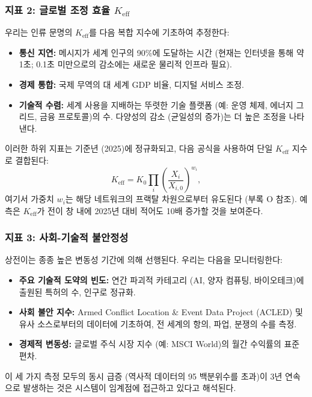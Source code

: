 \documentclass[12pt,a4paper]{article}
\theoremstyle{remark}
\begin{document}
	\subsubsection{지표 2: 글로벌 조정 효율 \(K_{\text{eff}}\)}
	
	우리는 인류 문명의 \(K_{\text{eff}}\)를 다음 복합 지수에 기초하여 추정한다:
	
	\begin{itemize}
		\item \textbf{통신 지연:} 메시지가 세계 인구의 90\%에 도달하는 시간 (현재는 인터넷을 통해 약 1초; 0.1초 미만으로의 감소에는 새로운 물리적 인프라 필요).
		\item \textbf{경제 통합:} 국제 무역의 대 세계 GDP 비율, 디지털 서비스 조정.
		\item \textbf{기술적 수렴:} 세계 사용을 지배하는 뚜렷한 기술 플랫폼 (예: 운영 체제, 에너지 그리드, 금융 프로토콜)의 수. 다양성의 감소 (균일성의 증가)는 더 높은 조정을 나타낸다.
	\end{itemize}
	
	이러한 하위 지표는 기준년 (2025)에 정규화되고, 다음 공식을 사용하여 단일 \(K_{\text{eff}}\) 지수로 결합된다:
	\[
	K_{\text{eff}} = K_0 \prod_{i} \left(\frac{X_i}{X_{i,0}}\right)^{w_i},
	\]
	여기서 가중치 \(w_i\)는 해당 네트워크의 프랙탈 차원으로부터 유도된다 (부록 O 참조). 예측은 \(K_{\text{eff}}\)가 전이 창 내에 2025년 대비 적어도 10배 증가할 것을 보여준다.
	
	\subsubsection{지표 3: 사회-기술적 불안정성}
	
	상전이는 종종 높은 변동성 기간에 의해 선행된다. 우리는 다음을 모니터링한다:
	
	\begin{itemize}
		\item \textbf{주요 기술적 도약의 빈도:} 연간 파괴적 카테고리 (AI, 양자 컴퓨팅, 바이오테크)에 출원된 특허의 수, 인구로 정규화.
		\item \textbf{사회 불안 지수:} Armed Conflict Location \& Event Data Project (ACLED) 및 유사 소스로부터의 데이터에 기초하여, 전 세계의 항의, 파업, 분쟁의 수를 측정.
		\item \textbf{경제적 변동성:} 글로벌 주식 시장 지수 (예: MSCI World)의 월간 수익률의 표준 편차.
	\end{itemize}
	
	이 세 가지 측정 모두의 동시 급증 (역사적 데이터의 95 백분위수를 초과)이 3년 연속으로 발생하는 것은 시스템이 임계점에 접근하고 있다고 해석된다.
	
\end{document}
